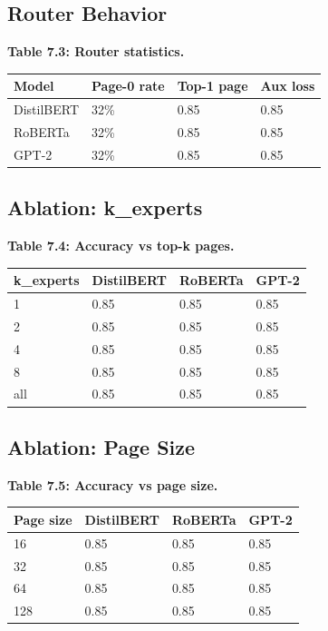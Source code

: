 \subsection{Router Behavior}

\textbf{Table 7.3: Router statistics.}

\begin{table}[H]
\centering
\small
\begin{tabular}{llll}
\toprule
\textbf{Model} & \textbf{Page-0 rate} & \textbf{Top-1 page} & \textbf{Aux loss} \\
\midrule
DistilBERT & 32\% & 0.85 & 0.85 \\
RoBERTa & 32\% & 0.85 & 0.85 \\
GPT-2 & 32\% & 0.85 & 0.85 \\
\bottomrule
\end{tabular}
\end{table}

\subsection{Ablation: k\_experts}

\textbf{Table 7.4: Accuracy vs top-k pages.}

\begin{table}[H]
\centering
\small
\begin{tabular}{llll}
\toprule
\textbf{k\_experts} & \textbf{DistilBERT} & \textbf{RoBERTa} & \textbf{GPT-2} \\
\midrule
1 & 0.85 & 0.85 & 0.85 \\
2 & 0.85 & 0.85 & 0.85 \\
4 & 0.85 & 0.85 & 0.85 \\
8 & 0.85 & 0.85 & 0.85 \\
all & 0.85 & 0.85 & 0.85 \\
\bottomrule
\end{tabular}
\end{table}

\subsection{Ablation: Page Size}

\textbf{Table 7.5: Accuracy vs page size.}

\begin{table}[H]
\centering
\small
\begin{tabular}{llll}
\toprule
\textbf{Page size} & \textbf{DistilBERT} & \textbf{RoBERTa} & \textbf{GPT-2} \\
\midrule
16 & 0.85 & 0.85 & 0.85 \\
32 & 0.85 & 0.85 & 0.85 \\
64 & 0.85 & 0.85 & 0.85 \\
128 & 0.85 & 0.85 & 0.85 \\
\bottomrule
\end{tabular}
\end{table}

